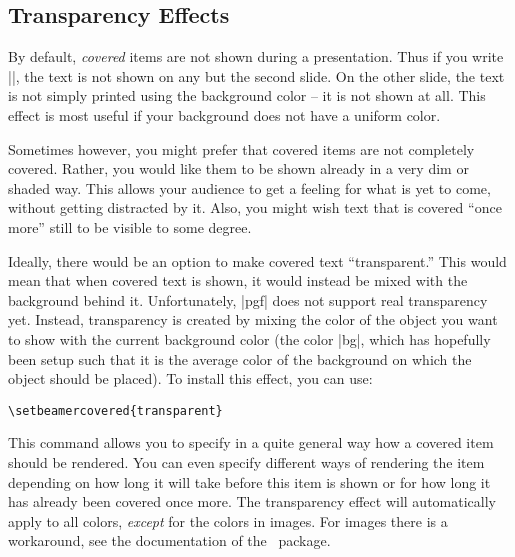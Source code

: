 \subsection{Transparency Effects}
\label{section-transparent}

By default, \emph{covered} items are not shown during a
presentation. Thus if you write ||, the text
is not shown on any but the second slide. On the other slide, the text
is not simply printed using the background color -- it is not shown at
all. This effect is most useful if your background does not have a
uniform color.

Sometimes however, you might prefer that covered items are not
completely covered. Rather, you would like them to be shown already in
a very dim or shaded way. This allows your audience to get a feeling
for what is yet to come, without getting distracted by it. Also, you
might wish text that is covered ``once more'' still to be visible to
some degree.

Ideally, there would be an option to make covered text
``transparent.'' This would mean that when covered text is shown, it
would instead be mixed with the background behind it. Unfortunately,
|pgf| does not support real transparency yet. Instead, transparency is
created by mixing the color of the object you want to show with the
current background color (the color |bg|, which has hopefully been
setup such that it is the average color of the background on which the
object should be placed). To install this effect, you can use:
\begin{verbatim}
\setbeamercovered{transparent}
\end{verbatim}
This command allows you to specify in a quite general way how a
covered item should be rendered. You can even specify different ways
of rendering the item depending on how long it will take before this
item is shown or for how long it has already been covered once
more. The transparency effect will automatically apply to all colors,
\emph{except} for the colors in images. For images there is a
workaround, see the documentation of the \pgf\ package. 

